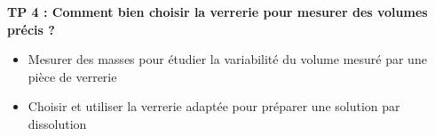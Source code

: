 
\renewcommand{\thesubsection}{\textcolor{red}{\Roman{section}.\arabic{subsection}}}
\renewcommand{\thesubsubsection}{\textcolor{red}{\Roman{section}.\arabic{subsection}.\alph{subsubsection}}}

\setcounter{section}{0}
\setcounter{document}{0}
\sndEnTeteTPQuatre

\begin{center}
\begin{mdframed}[style=titr, leftmargin=60pt, rightmargin=60pt, innertopmargin=7pt, innerbottommargin=7pt, innerrightmargin=8pt, innerleftmargin=8pt]

\begin{center}
\large{\textbf{TP 4 : Comment bien choisir la verrerie pour mesurer des volumes précis ?}}
\end{center}


\end{mdframed}
\end{center}

    

\begin{tcolorbox}[colback=blue!5!white,colframe=blue!75!black,title=Objectifs de la séance :]
\begin{itemize}
    \item Mesurer des masses pour étudier la variabilité du volume mesuré par une pièce de verrerie
  \item Choisir et utiliser la verrerie adaptée pour préparer une solution par dissolution
\end{itemize}
\end{tcolorbox}


